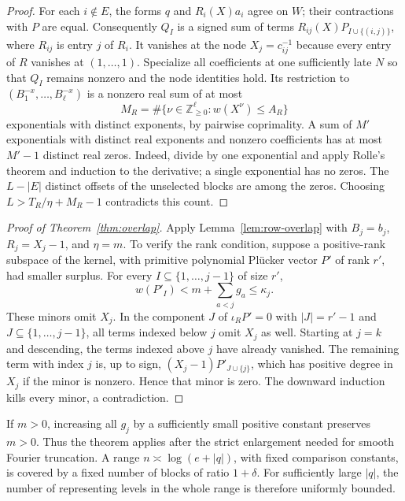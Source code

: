 \documentclass[11pt,a4paper,reqno]{amsart}
\theoremstyle{definition}
\theoremstyle{remark}
\numberwithin{equation}{section}
\begin{document}
\begin{proof}
For each \(i\notin E\), the forms \(q\) and \(R_i(X)a_i\)
agree on \(W\); their contractions with \(P\) are equal.
Consequently \(Q_I\) is a signed sum of terms
\(R_{ij}(X)P_{I\cup\{(i,j)\}}\), where \(R_{ij}\) is entry
\(j\) of \(R_i\). It vanishes at the node \(X_j=c_{ij}^{-1}\)
because every entry of \(R\) vanishes at \((1,\ldots,1)\).
Specialize all coefficients at one sufficiently late \(N\) so
that \(Q_I\) remains nonzero and the node identities hold.
Its restriction to \((B_1^{-x},\ldots,B_\ell^{-x})\) is a
nonzero real sum of at most
\[
                M_R=\#\{\nu\in\mathbb Z_{\ge0}^{\ell}:
                                  w(X^\nu)\le A_R\}
\]
exponentials with distinct exponents, by pairwise coprimality.
A sum of \(M'\) exponentials with distinct real exponents and
nonzero coefficients has at most \(M'-1\) distinct real zeros.
Indeed, divide by one exponential and apply Rolle's theorem
and induction to the derivative; a single exponential has
no zeros. The \(L-|E|\) distinct offsets of the unselected
blocks are among the zeros. Choosing \(L>T_R/\eta+M_R-1\)
contradicts this count.
\end{proof}

\begin{proof}[Proof of Theorem~\ref{thm:overlap}]
Apply Lemma~\ref{lem:row-overlap} with \(B_j=b_j\),
\(R_j=X_j-1\), and \(\eta=m\). To verify the rank condition,
suppose a positive-rank subspace of the kernel, with primitive
polynomial Pl\"ucker vector \(P'\) of rank \(r'\), had smaller
surplus. For every \(I\subseteq\{1,\ldots,j-1\}\) of size \(r'\),
\[
         w(P'_I)<m+\sum_{a<j}g_a\le\kappa_j .
\]
These minors omit \(X_j\). In the component \(J\) of
\(\iota_R P'=0\) with \(|J|=r'-1\) and
\(J\subseteq\{1,\ldots,j-1\}\), all terms indexed below \(j\)
omit \(X_j\) as well. Starting at \(j=k\) and descending,
the terms indexed above \(j\) have already vanished. The
remaining term with index \(j\) is, up to sign,
\((X_j-1)P'_{J\cup\{j\}}\), which has positive degree in
\(X_j\) if the minor is nonzero. Hence that minor is zero.
The downward induction kills every minor, a contradiction.
\end{proof}

If \(m>0\), increasing all \(g_j\) by a sufficiently small positive
constant preserves \(m>0\). Thus the theorem applies after the
strict enlargement needed for smooth Fourier truncation. A range
\(n\asymp\log(e+|q|)\), with fixed comparison constants, is covered
by a fixed number of blocks of ratio \(1+\delta\). For sufficiently
large \(|q|\), the number of representing levels in the whole
range is therefore uniformly bounded.
\end{document}
